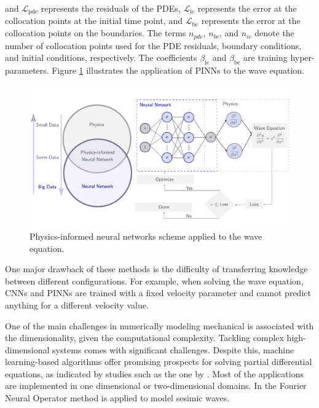 \documentclass[11pt,twoside]{article}
\begin{document}
and \( \mathcal{L}_{\text{pde}} \) represents the residuals of the PDEs, \( \mathcal{L}_{\text{ic}} \) represents the error at the 
collocation points at the initial time point, and \( \mathcal{L}_{\text{bc}} \) represents the error at the collocation points 
on the boundaries. The terms \( n_{pde} \), \( n_{bc} \), and \( n_{ic} \) denote the number of collocation points used for the 
PDE residuals, boundary conditions, and initial conditions, respectively. The coefficients \(\beta_{\text{ic}}\) and \(\beta_{\text{bc}}\) 
are training hyper-parameters. Figure \ref{fig:physics_informed_neural_networks} illustrates the application of PINNs to the wave equation.

\begin{figure}[h]
    \centering
        \includegraphics[width=1.0\textwidth]{figs/scheme_PINNs_waves.pdf}
        \caption{Physics-informed neural networks scheme applied to the wave equation.}
        \label{fig:physics_informed_neural_networks}
\end{figure}
    

One major drawback of these methods is the difficulty of transferring knowledge between different configurations. For example, when solving 
the wave equation, CNNs and PINNs are trained with a fixed velocity parameter and cannot predict anything for a different velocity value. 

One of the main challenges in numerically modeling mechanical is associated with the dimensionality, given the computational complexity. 
Tackling complex high-dimensional systems comes with significant challenges. Despite this, machine learning-based algorithms offer promising 
prospects for solving partial differential equations, as indicated by studies such as the one by . 
Most of the applications are implemented in one dimensional or two-dimensional domains. In  the Fourier 
Neural Operator method is applied to model sesimic waves.
\end{document}
